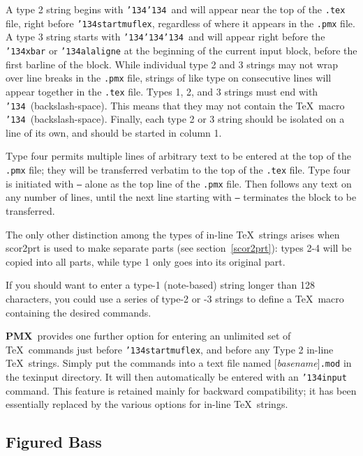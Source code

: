 \documentclass[11pt]{article}
\def\bs{{\tt\char'134}}
\newcommand\PMXX{\textbf{PMX}}
\newcommand\PMX{\PMXX~}
\begin{document}
A type 2 string begins with \bs\bs\ 
and will appear near the top of the {\tt .tex} file, right before 
\bs{\tt startmuflex}, regardless of where it appears in the {\tt .pmx} file.  
A type 3 string starts with \bs\bs\bs\ and will appear right before the 
{\tt\bs xbar}
or {\tt \bs alaligne} at the beginning of the current input block, before the
first barline of the block.  While individual type 2 and 3 strings may not wrap 
over line breaks in the {\tt .pmx} file, strings of like type on consecutive 
lines will appear together in the {\tt .tex} file.   
Types 1, 2, and 3 strings must end with \bs\ (backslash-space). 
This means that they may not contain
the \TeX\ macro \bs\  (backslash-space).  Finally, each type 2 or 3 string
should be isolated on a line of its own, and should be started in column 1.

Type four permits multiple
lines of arbitrary text to be entered at the top of the {\tt .pmx} file;
they will be transferred verbatim to the top of the {\tt .tex} file.  Type
four is initiated with {\tt ---} alone as the top line of the {\tt .pmx}
file.  Then follows any text on any number of lines, until the next line
starting with {\tt ---} terminates the block to be transferred.  

The only other distinction among the types of in-line \TeX\ strings arises when 
{\bfx scor2prt} is used to make separate parts 
(see section~\ref{scor2prt}):
types 2-4 will be copied into all parts, while type 1 only goes into its 
original part. 

If you should want to enter a type-1 (note-based) string longer than 
128 characters, you could use a series of type-2 or -3 strings to define
a \TeX\ macro containing the desired commands.  

	\PMX provides one further option for entering an unlimited set of
\TeX ~commands 
just before \bs{\tt startmuflex}, and before any Type 2 in-line \TeX ~strings. 
Simply put the commands into a text file named [{\it basename}]{\tt .mod} 
in the texinput directory.  It will then automatically be 
entered with an \bs{\tt input} command.  This feature is retained mainly for 
backward compatibility; it has been essentially replaced by the various options
for in-line \TeX ~strings.

\subsection{Figured Bass}
\end{document}
